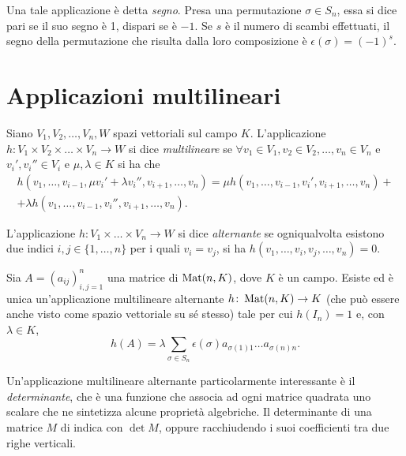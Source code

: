 Una tale applicazione è detta \emph{segno}.
Presa una permutazione $\sigma\in S_n$, essa si dice pari se il suo segno è 1, dispari se è $-1$.
Se $s$ è il numero di scambi effettuati, il segno della permutazione che risulta dalla loro composizione è $\epsilon(\sigma)=(-1)^s$.

\section{Applicazioni multilineari}
\begin{definizione} \label{d:applicazione-multilineare}
	Siano $V_1,V_2,\dots,V_n,W$ spazi vettoriali sul campo $K$.
	L'applicazione $h\colon V_1\times V_2\times\dots\times V_n\to W$ si dice \emph{multilineare} se $\forall v_1\in V_1,v_2\in V_2,\dots,v_n\in V_n$ e $v_i',v_i''\in V_i$ e $\mu,\lambda\in K$ si ha che
	\begin{multline*}
		h(v_1,\dots,v_{i-1},\mu v_i'+\lambda v_i'',v_{i+1},\dots,v_n)=\mu h(v_1,\dots,v_{i-1},v_i',v_{i+1},\dots,v_n)+\\+\lambda h(v_1,\dots,v_{i-1},v_i'',v_{i+1},\dots,v_n).
	\end{multline*}
\end{definizione}
\begin{definizione} \label{d:applicazione-multilineare-alternante}
	L'applicazione $h\colon V_1\times\dots\times V_n\to W$ si dice \emph{alternante} se ogniqualvolta esistono due indici $i,j\in\{1,\dots,n\}$ per i quali $v_i=v_j$, si ha $h(v_1,\dots,v_i,v_j,\dots,v_n)=0$.
\end{definizione}
\begin{teorema}[di unicità] \label{t:unicita-applicazione-multilineare-alternante}
	Sia $A=(a_{ij})_{i,j=1}^n$ una matrice di $\operatorname{Mat}(n,K)$, dove $K$ è un campo.
	Esiste ed è unica un'applicazione multilineare alternante $h\colon\operatorname{Mat}(n,K)\to K$ (che può essere anche visto come spazio vettoriale su sé stesso) tale per cui $h(I_n)=1$ e, con $\lambda\in K$, 
	\begin{equation*}
		h(A)=\lambda\sum_{\sigma\in S_n}\epsilon(\sigma)a_{\sigma(1)1}\dots a_{\sigma(n)n}.
	\end{equation*}
\end{teorema}
Un'applicazione multilineare alternante particolarmente interessante è il \emph{determinante}, che è una funzione che associa ad ogni matrice quadrata uno scalare che ne sintetizza alcune proprietà algebriche.
Il determinante di una matrice $M$ di indica con $\det M$, oppure racchiudendo i suoi coefficienti tra due righe verticali.

